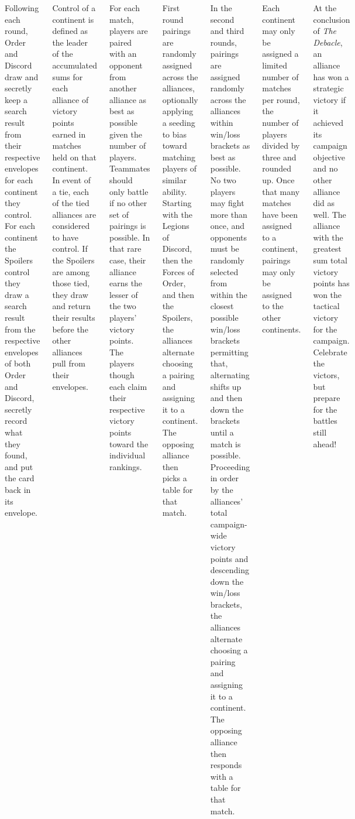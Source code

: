 \begin{columns}
\columnbreak

Following each round, Order and Discord draw and secretly keep a
search result from their respective envelopes for each continent they
control.  For each continent the Spoilers control they draw a search
result from the respective envelopes of both Order and Discord,
secretly record what they found, and put the card back in its
envelope.

Control of a continent is defined as the leader of the accumulated
sums for each alliance of victory points earned in matches held on
that continent.  In event of a tie, each of the tied alliances are
considered to have control.  If the Spoilers are among those tied,
they draw and return their results before the other alliances pull
from their envelopes.


For each match, players are paired with an opponent from another
alliance as best as possible given the number of players.  Teammates
should only battle if no other set of pairings is possible.  In that
rare case, their alliance earns the lesser of the two players' victory
points.  The players though each claim their respective victory points
toward the individual rankings.

First round pairings are randomly assigned across the alliances,
optionally applying a seeding to bias toward matching players of
similar ability.  Starting with the Legions of Discord, then the
Forces of Order, and then the Spoilers, the alliances alternate
choosing a pairing and assigning it to a continent.  The opposing
alliance then picks a table for that match.

In the second and third rounds, pairings are assigned randomly across
the alliances within win/loss brackets as best as possible.  No two
players may fight more than once, and opponents must be randomly
selected from within the closest possible win/loss brackets permitting
that, alternating shifts up and then down the brackets until a match
is possible.  Proceeding in order by the alliances' total
campaign-wide victory points and descending down the win/loss
brackets, the alliances alternate choosing a pairing and assigning it
to a continent.  The opposing alliance then responds with a table for
that match.

Each continent may only be assigned a limited number of matches per
round, the number of players divided by three and rounded up.  Once
that many matches have been assigned to a continent, pairings may only
be assigned to the other continents.


At the conclusion of \emph{The Debacle}, an alliance has won a
strategic victory if it achieved its campaign objective and no other
alliance did as well.  The alliance with the greatest sum total
victory points has won the tactical victory for the campaign.
Celebrate the victors, but prepare for the battles still ahead!

\end{columns}

